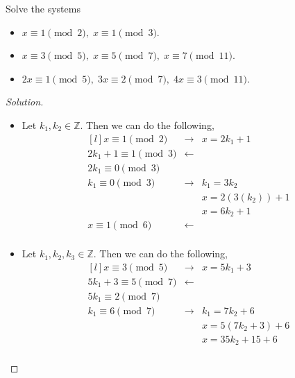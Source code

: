 \documentclass[11pt]{article}
\newcommand{\Z}{\mathbb{Z}}
\newenvironment{problem}[2][Problem]{\begin{trivlist}
\item[\hskip \labelsep {\bfseries #1}\hskip \labelsep {\bfseries #2.}]}{\end{trivlist}}
\newenvironment{solution}
  {\renewcommand\qedsymbol{$~$}\begin{proof}[Solution]$ $\par\nobreak\ignorespaces}
  {\end{proof}}
\begin{document}
\begin{problem}{3}
Solve the systems
\begin{itemize}
  \item [(a)] $x\equiv 1 \pmod{2},\; x\equiv 1 \pmod{3}$.
  \item [(b)] $x\equiv 3 \pmod{5}, \; x\equiv 5\pmod{7}, \; x \equiv 7 \pmod{11}$.
  \item [(c)] $2x\equiv 1 \pmod{5}, \; 3x\equiv 2 \pmod{7}, \; 4x\equiv 3 \pmod{11}$.
\end{itemize}
\end{problem}

\begin{solution}
  \begin{itemize}
    \item [(a)] Let $k_1, k_2\in \Z$. Then we can do the following,
          \[
            \begin{matrix*}[l]
              x \equiv 1 \pmod{2}        & \rightarrow & x= 2k_1 + 1      \\
              2k_1 + 1 \equiv 1 \pmod{3} & \leftarrow  &                  \\
              2k_1 \equiv 0 \pmod{3}     &                                \\
              k_1 \equiv 0 \pmod{3}      & \rightarrow & k_1 = 3k_2       \\
              &             & x= 2(3(k_2)) + 1 \\
              &             & x= 6k_2 + 1      \\
              x \equiv 1 \pmod{6}        & \leftarrow  &                  \\
            \end{matrix*}
          \]
    \item [(b)] Let $k_1, k_2, k_3 \in \Z$. Then we can do the following,
          \[
            \begin{matrix*}[l]
              x \equiv 3 \pmod{5}           & \rightarrow & x= 5k_1 + 3           \\
              5k_1 + 3 \equiv 5 \pmod{7}    & \leftarrow  &                       \\
              5k_1 \equiv 2 \pmod{7}        &             &                       \\
              k_1 \equiv 6 \pmod{7}         & \rightarrow & k_1= 7k_2 + 6         \\
              &             & x= 5(7k_2 + 3) + 6    \\
              &             & x= 35k_2 + 15 + 6     \\

\end{matrix*}\]
\end{itemize}
\end{solution}
\end{document}
